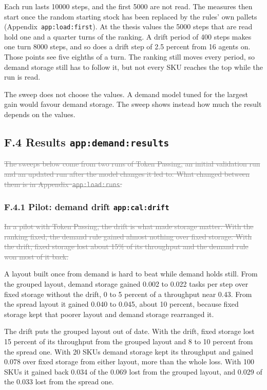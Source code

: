 \documentclass[11pt,a4paper]{article}
\newcommand{\old}[1]{\textcolor{gray}{\sout{#1}}}
\newenvironment{greenblock}{\color{newc}}{}
\newcommand{\lref}[1]{{\small\texttt{#1}}}
\begin{document}
\begin{greenblock}
Each run lasts 10000 steps, and the first 5000 are not read. The measures
then start once the random starting stock has been replaced by the rules' own
pallets (Appendix~\lref{app:load:first}). At the thesis values the 5000 steps
that are read hold one and a quarter turns of the ranking. A drift period of
400 steps makes one turn 8000 steps, and so does a drift step of 2.5 percent
from 16 agents on. Those points see five eighths of a turn. The ranking still
moves every period, so demand storage still has to follow it, but not every
SKU reaches the top while the run is read.
\end{greenblock}

The sweep does not choose the values. A demand model tuned for the largest
gain would favour demand storage. The sweep shows instead how much the result
depends on the values.

\subsection*{F.4 Results \hfill\lref{app:demand:results}}

\old{The sweeps below come from two runs of Token Passing, an initial
validation run and an updated run after the model changes it led to. What
changed between them is in Appendix~\lref{app:load:runs}.}

\subsubsection*{F.4.1 Pilot: demand drift \hfill\lref{app:cal:drift}}

\old{In a pilot with Token Passing, the drift is what made storage matter.
With the ranking fixed, the demand rule gained almost nothing over fixed
storage. With the drift, fixed storage lost about 15\% of its throughput and
the demand rule won most of it back.}

\begin{greenblock}
A layout built once from demand is hard to beat while demand holds still.
From the grouped layout, demand storage gained 0.002 to 0.022 tasks per step
over fixed storage without the drift, 0 to 5 percent of a throughput near
0.43. From the spread layout it gained 0.040 to 0.045, about 10 percent,
because fixed storage kept that poorer layout and demand storage rearranged
it.

The drift puts the grouped layout out of date. With the drift, fixed storage
lost 15 percent of its throughput from the grouped layout and 8 to 10 percent
from the spread one. With 20 SKUs demand storage kept its throughput and
gained 0.078 over fixed storage from either layout, more than the whole loss.
With 100 SKUs it gained back 0.034 of the 0.069 lost from the grouped layout,
and 0.029 of the 0.033 lost from the spread one.
\end{greenblock}
\end{document}

